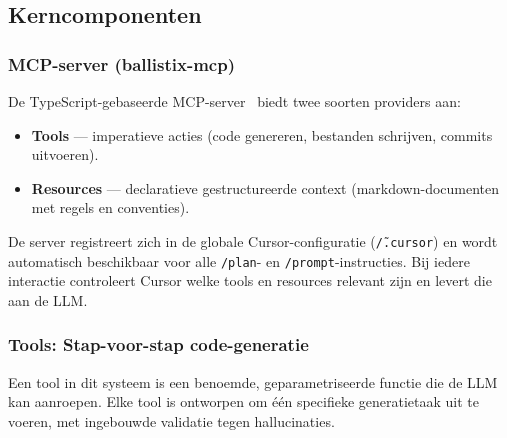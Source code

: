\subsection{Kerncomponenten}

\subsubsection{MCP-server (ballistix-mcp)}

De TypeScript-gebaseerde MCP-server~\autocite{MCPTypeScriptSDK2025} biedt twee soorten providers aan:

\begin{itemize}
  \item \textbf{Tools} — imperatieve acties (code genereren, bestanden schrijven, commits uitvoeren).
  \item \textbf{Resources} — declaratieve gestructureerde context (markdown-documenten met regels en conventies).
\end{itemize}

De server registreert zich in de globale Cursor-configuratie (\texttt{\~/.cursor}) en wordt automatisch beschikbaar voor alle \texttt{/plan}- en \texttt{/prompt}-instructies. Bij iedere interactie controleert Cursor welke tools en resources relevant zijn en levert die aan de LLM.

\subsubsection{Tools: Stap-voor-stap code-generatie}

Een tool in dit systeem is een benoemde, geparametriseerde functie die de LLM kan aanroepen. Elke tool is ontworpen om één specifieke generatietaak uit te voeren, met ingebouwde validatie tegen hallucinaties.

